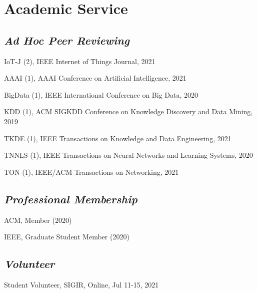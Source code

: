 
\vspace{-8pt}
\section*{Academic Service}
\vspace{-4pt}


\subsection*{\textnormal{\textit{Ad Hoc Peer Reviewing}}}
\vspace{-4pt}
\indent

IoT-J (2), IEEE Internet of Things Journal, 2021

AAAI (1), AAAI Conference on Artificial Intelligence, 2021

BigData (1), IEEE International Conference on Big Data, 2020

KDD (1), ACM SIGKDD Conference on Knowledge Discovery and Data Mining, 2019

TKDE (1), IEEE Transactions on Knowledge and Data Engineering, 2021

TNNLS (1), IEEE Transactions on Neural Networks and Learning Systems, 2020

TON (1), IEEE/ACM Transactions on Networking, 2021

\subsection*{\textnormal{\textit{Professional Membership}}}
\vspace{-4pt}
\indent 

ACM, Member (2020)

IEEE, Graduate Student Member (2020)

\subsection*{\textnormal{\textit{Volunteer}}}
\vspace{-4pt}
\indent 

Student Volunteer, SIGIR, Online, Jul 11-15, 2021